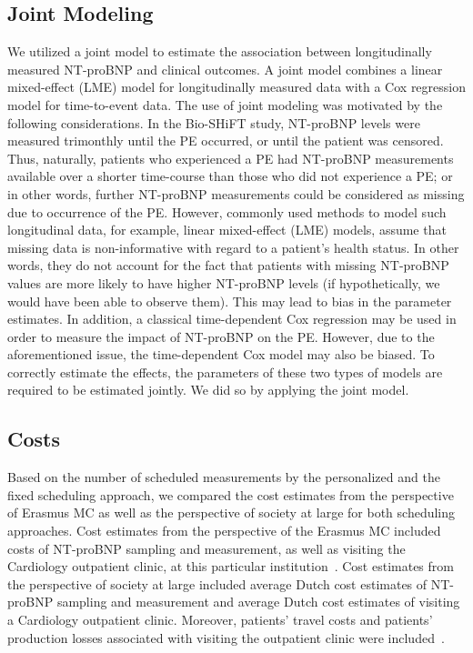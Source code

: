 \begin{subappendices}
\subsection{Joint Modeling}
We utilized a joint model to estimate the association between longitudinally measured NT-proBNP and clinical outcomes. A joint model combines a linear mixed-effect (LME) model for longitudinally measured data with a Cox regression model for time-to-event data. The use of joint modeling was motivated by the following considerations. In the Bio-SHiFT study, NT-proBNP levels were measured trimonthly until the PE occurred, or until the patient was censored. Thus, naturally, patients who experienced a PE had NT-proBNP measurements available over a shorter time-course than those who did not experience a PE; or in other words, further NT-proBNP measurements could be considered as missing due to occurrence of the PE. However, commonly used methods to model such longitudinal data, for example, linear mixed-effect (LME) models, assume that missing data is non-informative with regard to a patient's health status. In other words, they do not account for the fact that patients with missing NT-proBNP values are more likely to have higher NT-proBNP levels (if hypothetically, we would have been able to observe them). This may lead to bias in the parameter estimates. In addition, a classical time-dependent Cox regression may be used in order to measure the impact of NT-proBNP on the PE. However, due to the aforementioned issue, the time-dependent Cox model may also be biased. To correctly estimate the effects, the parameters of these two types of models are required to be estimated jointly. We did so by applying the joint model.

\subsection{Costs}
Based on the number of scheduled measurements by the personalized and the fixed scheduling approach, we compared the cost estimates from the perspective of Erasmus MC as well as the perspective of society at large for both scheduling approaches. Cost estimates from the perspective of the Erasmus MC included costs of NT-proBNP sampling and measurement, as well as visiting the Cardiology outpatient clinic, at this particular institution~\citep{kanters2017update,hakkaart2015costing}. Cost estimates from the perspective of society at large included average Dutch cost estimates of NT-proBNP sampling and measurement and average Dutch cost estimates of visiting a Cardiology outpatient clinic. Moreover, patients' travel costs and patients' production losses associated with visiting the outpatient clinic were included~\citep{kanters2017update,hakkaart2015costing}.


\end{subappendices}
